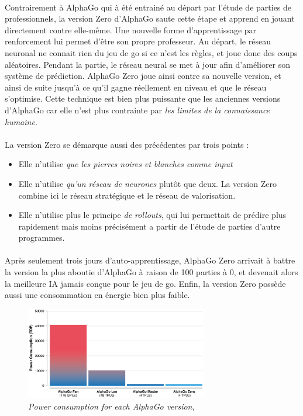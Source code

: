 \paragraph{} Contrairement à AlphaGo qui à été entrainé au départ par l'étude de parties de professionnels, la version Zero d'AlphaGo saute
cette étape et apprend en jouant directement contre elle-même. Une nouvelle forme \cite{AlphaGo2} d'apprentissage par renforcement lui permet
d'être son propre professeur. Au départ, le réseau neuronal ne connait rien du jeu de go si ce n'est les règles, et joue donc des coups aléatoires.
Pendant la partie, le réseau neural se met à jour afin d'améliorer son système de prédiction. AlphaGo Zero joue ainsi contre sa nouvelle version,
et ainsi de suite jusqu'à ce qu'il gagne réellement en niveau et que le réseau s'optimise. Cette technique est bien plus puissante que les anciennes
versions d'AlphaGo car elle n'est plus contrainte par \emph{les limites de la connaissance humaine}. 

\paragraph{} La version Zero se démarque aussi des précédentes par trois points :

\begin{itemize}
    \item Elle n'utilise \emph{que les pierres noires et blanches comme input}
    \item Elle n'utilise \emph{qu'un réseau de neurones} plutôt que deux. La version Zero combine ici le réseau stratégique et le réseau de valorisation.
    \item Elle n'utilise plus le principe \emph{de rollouts}, qui lui permettait de prédire plus rapidement mais moins précisément a partir de l'étude de parties d'autre programmes. 
\end{itemize}

\paragraph{} Après seulement trois jours d'auto-apprentissage, AlphaGo Zero arrivait à battre la version la plus aboutie d'AlphaGo à raison de 100 parties à 0,
et devenait alors la meilleure IA jamais conçue pour le jeu de go. Enfin, la version Zero possède aussi une consommation en énergie bien plus faible.

\begin{figure}[h]
    \centering
    \includegraphics[width=300px]{chapters/03/images/alphago-consumption.png}
    \caption{\label{comparatif}\emph{Power consumption for each AlphaGo version}, \cite{AlphaGo2}}
\end{figure}

